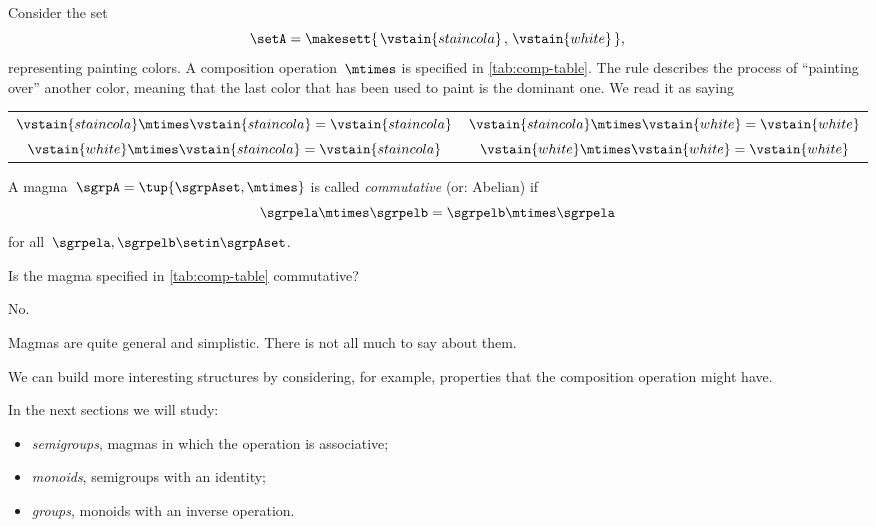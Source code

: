 \begin{example}
    Consider the set
    \begin{equation*}
        \setA = \makesett{\hspace{0.05cm} \vstain{staincola}\hspace{0.05cm},\hspace{0.05cm} \vstain{white}\hspace{0.05cm}},
    \end{equation*}
    representing painting colors.
    A composition operation~$\mtimes$ is specified in \cref{tab:comp-table}.
    The rule describes the process of ``painting over'' another color, meaning that the last color that has been used to paint is the dominant one.
    We read it as saying
    \begin{center}
        \setlength{\tabcolsep}{20pt}
        \begin{tabular}{cc}
            $\vstain{staincola} \mtimes \vstain{staincola} = \vstain{staincola}$ & $\vstain{staincola} \mtimes \vstain{white} = \vstain{white}$ \\
            $\vstain{white} \mtimes \vstain{staincola}     = \vstain{staincola}$ & $\vstain{white} \mtimes \vstain{white} = \vstain{white}$
        \end{tabular}
    \end{center}
\end{example}

\begin{definition}
    \label{def:magma-commutativity}
    A magma~$\sgrpA = \tup{\sgrpAset, \mtimes}$ is called \emph{commutative} (or: Abelian) if
    \begin{equation}
        \label{eq:semigroup-commutativity}
        \sgrpela \mtimes   \sgrpelb = \sgrpelb \mtimes \sgrpela
    \end{equation}
    for all~$\sgrpela , \sgrpelb \setin \sgrpAset$.
\end{definition}

\begin{exercise}
    Is the magma specified in \cref{tab:comp-table} commutative?
\end{exercise}
\begin{solution}
    No.
\end{solution}

Magmas are quite general and simplistic.
There is not all much to say about them.

We can build more interesting structures by considering, for example, properties that the composition operation might have.

In the next sections we will study:

\begin{itemize}
    \item \emph{semigroups}, magmas in which the operation is associative;
    \item \emph{monoids}, semigroups with an identity;
    \item \emph{groups}, monoids with an inverse operation.
\end{itemize}
